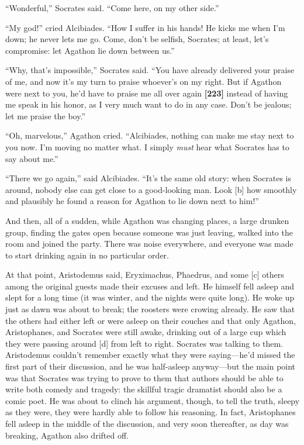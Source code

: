 “Wonderful,” Socrates said. “Come here, on my other side.”

“My god!” cried Alcibiades. “How I suffer in his hands! He kicks me when
I'm down; he never lets me go. Come, don't be selfish, Socrates; at
least, let's compromise: let Agathon lie down between us.”

“Why, that's impossible,” Socrates said. “You have already delivered
your praise of me, and now it's my turn to praise whoever's on my right.
But if Agathon were next to you, he'd have to praise me all over again
{\bf {[}223{]}} instead of having me speak in his honor, as I very much
want to do in any case. Don't be jealous; let me praise the boy.”

“Oh, marvelous,” Agathon cried. “Alcibiades, nothing can make me stay
next to you now. I'm moving no matter what. I simply {\em must} hear
what Socrates has to say about me.”

“There we go again,” said Alcibiades. “It's the same old story: when
Socrates is around, nobody else can get close to a good-looking man.
Look {[}b{]} how smoothly and plausibly he found a reason for Agathon to
lie down next to him!”

And then, all of a sudden, while Agathon was changing places, a large
drunken group, finding the gates open because someone was just leaving,
walked into the room and joined the party. There was noise everywhere,
and everyone was made to start drinking again in no particular order.

At that point, Aristodemus said, Eryximachus, Phaedrus, and some {[}c{]}
others among the original guests made their excuses and left. He himself
fell asleep and slept for a long time (it was winter, and the nights
were quite long). He woke up just as dawn was about to break; the
roosters were crowing already. He saw that the others had either left or
were asleep on their couches and that only Agathon, Aristophanes, and
Socrates were still awake, drinking out of a large cup which they were
passing around {[}d{]} from left to right. Socrates was talking to them.
Aristodemus couldn't remember exactly what they were saying---he'd
missed the first part of their discussion, and he was half-asleep
anyway---but the main point was that Socrates was trying to prove to
them that authors should be able to write both comedy and tragedy: the
skillful tragic dramatist should also be a comic poet. He was about to
clinch his argument, though, to tell the truth, sleepy as they were,
they were hardly able to follow his reasoning. In fact, Aristophanes
fell asleep in the middle of the discussion, and very soon thereafter,
as day was breaking, Agathon also drifted off.

